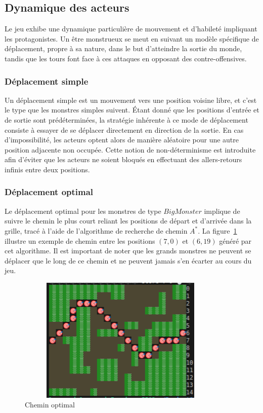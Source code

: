 \documentclass[11pt]{article}
\begin{document}
        \subsection{Dynamique des acteurs}
            Le jeu exhibe une dynamique particulière de mouvement et d'habileté impliquant les protagonistes. Un être monstrueux se meut en suivant un modèle spécifique de déplacement, propre à sa nature, dans le but d'atteindre la sortie du monde, tandis que les tours font face à ces attaques en opposant des contre-offensives.
            \subsubsection{Déplacement simple}
            Un déplacement simple est un mouvement vers une position voisine libre, et c'est le type que les monstres simples suivent. Étant donné que les positions d'entrée et de sortie sont prédéterminées, la stratégie inhérente à ce mode de déplacement consiste à essayer de se déplacer directement en direction de la sortie. En cas d'impossibilité, les acteurs optent alors de manière aléatoire pour une autre position adjacente non occupée. Cette notion de non-déterminisme est introduite afin d'éviter que les acteurs ne soient bloqués en effectuant des allers-retours infinis entre deux positions.
            \subsubsection{Déplacement optimal}\label{optimal chemin}
           
            Le déplacement optimal pour les monstres de type $BigMonster$ implique de suivre le chemin le plus court reliant les positions de départ et d'arrivée dans la grille, tracé à l'aide de l'algorithme de recherche de chemin $A^{*}$. La figure~\ref{fig: Astar_Road } illustre un exemple de chemin entre les positions $(7,0)$ et $(6,19)$ 
            généré par cet algorithme. Il est important de noter que les grands monstres ne peuvent se déplacer que le long de ce chemin et ne peuvent jamais s'en écarter au cours du jeu.
             \begin{figure}[h]
                \centering
                \includegraphics[height = 6cm, width = 10cm]{Astar_Road.png}
                \caption{Chemin optimal} 
                \label{fig: Astar_Road } 
            \end{figure}            
\end{document}
